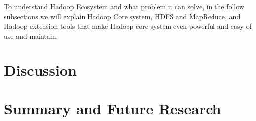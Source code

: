 \documentclass[11pt, oneside]{article}   	%
\begin{document}
To understand Hadoop Ecosystem and what problem it can solve, in the follow subsections we will explain Hadoop Core system, HDFS and MapReduce, and Hadoop extension tools that make Hadoop core system even powerful and easy of use and maintain. 


\section{Discussion}

\section{Summary and Future Research}

\printglossaries


\end{document}
